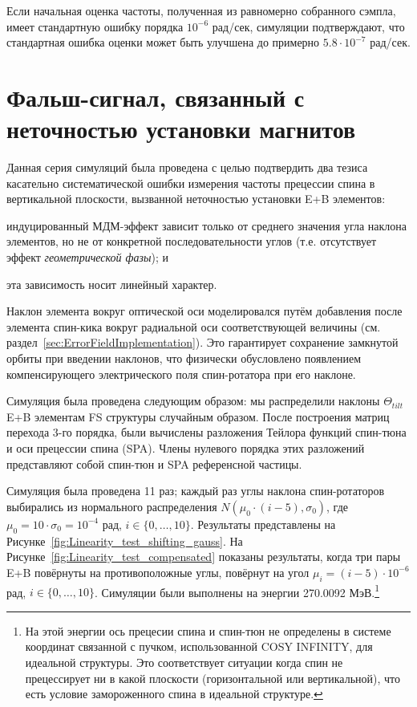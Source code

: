 \documentclass{report}
\newcommand{\vp}[2]{{#1}\cdot 10^{#2}}
\begin{document}
Если начальная оценка частоты, полученная из равномерно собранного
сэмпла, имеет стандартную ошибку порядка $10^{-6}$ рад/сек, симуляции
подтверждают, что стандартная ошибка оценки может быть улучшена до примерно $\vp{5.8}{-7}$ рад/сек.

\section{Фальш-сигнал, связанный с неточностью установки магнитов}
Данная серия симуляций была проведена с целью подтвердить два тезиса
касательно систематической ошибки измерения частоты прецессии спина в
вертикальной плоскости, вызванной неточностью установки E+B элементов:
\begin{inparaenum}[1)]
\item индуцированный МДМ-эффект зависит только от среднего значения
  угла наклона элементов, но не от  конкретной последовательности
  углов (т.е. отсутствует эффект \emph{геометрической фазы}); и
\item эта зависимость носит линейный характер.
\end{inparaenum}

Наклон элемента вокруг оптической оси моделировался путём добавления
после элемента спин-кика вокруг радиальной оси соответствующей
величины (см. раздел~\ref{sec:ErrorFieldImplementation}). Это
гарантирует сохранение замкнутой орбиты при введении наклонов, что
физически обусловлено появлением компенсирующего электрического поля 
спин-ротатора при его наклоне.

Симуляция была проведена следующим образом: мы распределили наклоны
$\Theta_{tilt}$ E+B элементам FS структуры случайным образом. После
построения матриц перехода 3-го порядка, были вычислены разложения
Тейлора функций спин-тюна и оси прецессии спина (SPA). Члены нулевого
порядка этих разложений представляют собой спин-тюн и SPA референсной частицы.

Симуляция была проведена 11 раз; каждый раз углы наклона
спин-ротаторов выбирались из нормального распределения
$N(\mu_0\cdot(i-5), \sigma_0)$, где $\mu_0 = 10\cdot \sigma_0 =
10^{-4}$ рад, $i\in\lbrace0,\dots, 10\rbrace$. Результаты представлены
на Рисунке~\ref{fig:Linearity_test_shifting_gauss}. На
Рисунке~\ref{fig:Linearity_test_compensated} показаны результаты,
когда три пары E+B повёрнуты на противоположные углы, повёрнут на угол
$\mu_i = (i-5)\cdot 10^{-6}$ рад,
$i\in\lbrace0,\dots,10\rbrace$. Симуляции были выполнены на энергии
270.0092 МэВ.\footnote{На этой энергии ось прецесии спина и спин-тюн
  не определены в системе координат связанной с пучком, использованной
  COSY INFINITY, для идеальной структуры. Это соответствует ситуации
  когда спин не прецессирует ни в какой плоскости (горизонтальной или
  вертикальной), что есть условие замороженного спина в идеальной структуре.}
\end{document}
